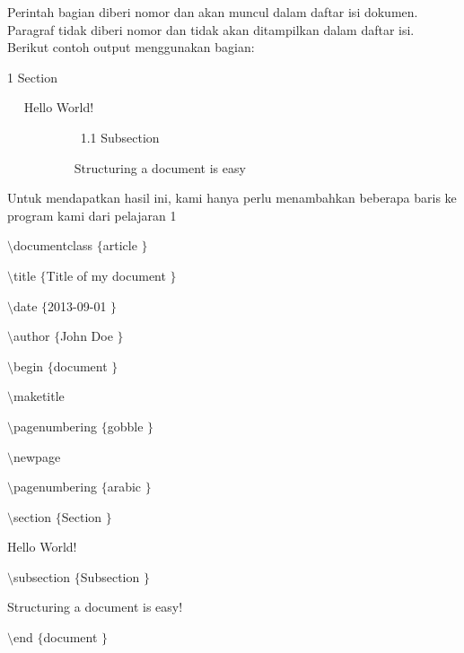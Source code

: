  \par
\vspace{12pt}
Perintah bagian diberi nomor dan akan muncul dalam daftar isi dokumen. Paragraf tidak diberi nomor dan tidak akan ditampilkan dalam daftar isi. Berikut contoh output menggunakan bagian:
 \par
1 Section
 \par
~~ Hello World!
 \par
~~~~~~~~~~~ 1.1 Subsection
 \par
~~~~~~~~~~ Structuring a document is easy
 \par
\vspace{12pt}

Untuk mendapatkan hasil ini, kami hanya perlu menambahkan beberapa baris ke program kami dari pelajaran 1
 \par
 $  \setminus  $documentclass $  \{  $article $  \}  $
 \par
\vspace{12pt}
 $  \setminus  $title $  \{  $Title of my document $  \}  $
 \par
 $  \setminus  $date $  \{  $2013-09-01 $  \}  $
 \par
 $  \setminus  $author $  \{  $John Doe $  \}  $
 \par
\vspace{12pt}
 $  \setminus  $begin $  \{  $document $  \}  $
 \par
\vspace{12pt}
 $  \setminus  $maketitle
 \par
 $  \setminus  $pagenumbering $  \{  $gobble $  \}  $
 \par
 $  \setminus  $newpage
 \par
 $  \setminus  $pagenumbering $  \{  $arabic $  \}  $
 \par
\vspace{12pt}
 $  \setminus  $section $  \{  $Section $  \}  $
 \par
\vspace{12pt}
Hello World!
 \par
\vspace{12pt}
 $  \setminus  $subsection $  \{  $Subsection $  \}  $
 \par
\vspace{12pt}
Structuring a document is easy!
 \par
\vspace{12pt}
 $  \setminus  $end $  \{  $document $  \}  $
 \par
\vspace{14pt}
